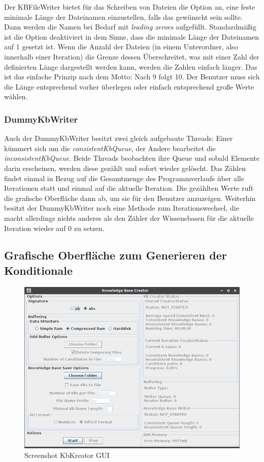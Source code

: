 \documentclass[12pt,a4paper]{article}
\begin{document}
Der KBFileWriter bietet für das Schreiben von Dateien die Option an, eine feste minimale Länge der Dateinamen einzustellen, falls das gewünscht sein sollte. Dann werden die Namen bei Bedarf mit \textit{leading zeroes} aufgefüllt. Standardmäßig ist die Option deaktiviert in dem Sinne, dass die minimale Länge der Dateinamen auf 1 gesetzt ist. Wenn die Anzahl der Dateien (in einem Unterordner, also innerhalb einer Iteration) die Grenze dessen Überschreitet, was mit einer Zahl der definierten Länge dargestellt werden kann, werden die Zahlen einfach länger. Das ist das einfache Prinzip nach dem Motto: Nach 9 folgt 10. Der Benutzer muss sich die Länge entsprechend vorher überlegen oder einfach entsprechend große Werte wählen. 


\subsubsection{DummyKbWriter}
\label{sec:dummywriter}
Auch der DummyKbWriter besitzt zwei gleich aufgebaute Threads: Einer kümmert sich um die \textit{consistentKbQueue}, der Andere bearbeitet die \textit{inconsistentKbQueue}. Beide Threads beobachten ihre Queue und sobald Elemente darin erscheinen, werden diese gezählt und sofort wieder gelöscht. Das Zählen findet einmal  in Bezug auf die Gesamtmenge des Programmverlaufs über alle Iterationen statt und einmal auf die aktuelle Iteration. Die gezählten Werte ruft die grafische Oberfläche dann ab, um sie für den Benutzer anzuzeigen. Weiterhin besitzt der DummyKbWriter noch eine Methode zum Iterationswechsel, die macht allerdings nichts anderes als den Zähler der Wissensbasen für die aktuelle Iteration wieder auf 0 zu setzen.

\subsection{Grafische Oberfläche zum Generieren der Konditionale}


\begin{figure}
\includegraphics[width=0.97\linewidth]{bilder/KbCreator_screen.png}
\caption{Screenshot KbKreator GUI}
\label{pic:kbcreator_screen}
\end{figure}
\end{document}
